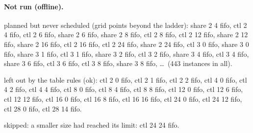 \documentclass[10pt]{article}
\begin{document}
\paragraph{Not run (offline).}
planned but never scheduled (grid points beyond the ladder): share 2 4 fifo, ctl 2 4 fifo, ctl 2 6 fifo, share 2 6 fifo, share 2 8 fifo, ctl 2 8 fifo, ctl 2 12 fifo, share 2 12 fifo, share 2 16 fifo, ctl 2 16 fifo, ctl 2 24 fifo, share 2 24 fifo, ctl 3 0 fifo, share 3 0 fifo, share 3 1 fifo, ctl 3 1 fifo, share 3 2 fifo, ctl 3 2 fifo, share 3 4 fifo, ctl 3 4 fifo, share 3 6 fifo, ctl 3 6 fifo, ctl 3 8 fifo, share 3 8 fifo, \ldots\ (443 instances in all).\par
left out by the table rules (ok): ctl 2 0 fifo, ctl 2 1 fifo, ctl 2 2 fifo, ctl 4 0 fifo, ctl 4 2 fifo, ctl 4 4 fifo, ctl 8 0 fifo, ctl 8 4 fifo, ctl 8 8 fifo, ctl 12 0 fifo, ctl 12 6 fifo, ctl 12 12 fifo, ctl 16 0 fifo, ctl 16 8 fifo, ctl 16 16 fifo, ctl 24 0 fifo, ctl 24 12 fifo, ctl 28 0 fifo, ctl 28 14 fifo.\par
skipped: a smaller size had reached its limit: ctl 24 24 fifo.\par
\end{document}
